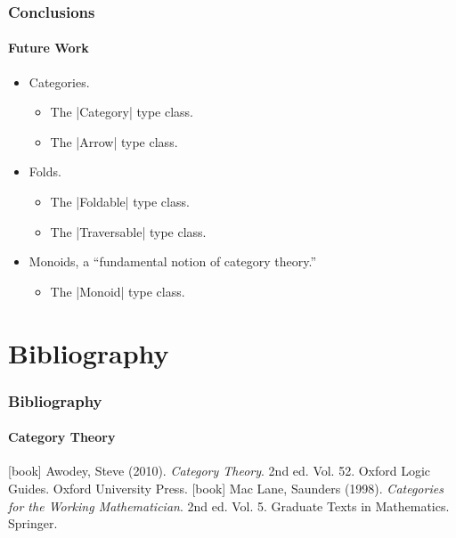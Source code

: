 \documentclass{beamer}
\begin{document}
\begin{frame}[fragile]
  \frametitle{Conclusions}
  \framesubtitle{Future Work}

  \begin{itemize}
  \item
    Categories.
    \begin{itemize}
    \item
      The |Category| type class.
    \item
      The |Arrow| type class.
    \end{itemize}
  \end{itemize}
  \begin{itemize}
  \item
    Folds.
    \begin{itemize}
    \item
      The |Foldable| type class.
    \item
      The |Traversable| type class.
    \end{itemize}
  \end{itemize}
  \begin{itemize}
  \item
    Monoids, a ``fundamental notion of category theory.''
    \begin{itemize}
    \item
      The |Monoid| type class.
    \end{itemize}
  \end{itemize}

\end{frame}


\section*{Bibliography}


\begin{frame}
  \frametitle{Bibliography}
  \framesubtitle{Category Theory}

  \begin{thebibliography}{Mac Lane 1998}
  [book]
    Awodey, Steve (2010).
    \newblock \emph{Category Theory}.
    \newblock 2nd ed. Vol. 52. Oxford Logic Guides.
    \newblock Oxford University Press.
  [book]
    Mac Lane, Saunders (1998).
    \newblock \emph{Categories for the Working Mathematician}.
    \newblock 2nd ed. Vol. 5. Graduate Texts in Mathematics.
    \newblock Springer.
  \end{thebibliography}

\end{frame}
\end{document}

